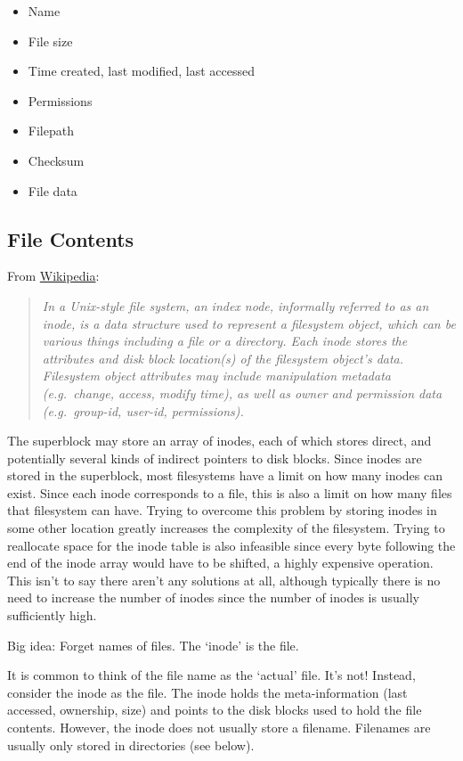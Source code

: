 \begin{itemize}
\tightlist
  \item Name
  \item File size
  \item Time created, last modified, last accessed
  \item Permissions
  \item Filepath
  \item Checksum
  \item File data
\end{itemize}

\subsection{File Contents}

From \href{http://en.wikipedia.org/wiki/Inode}{Wikipedia}:

\begin{quote}
  \emph{In a Unix-style file system, an index node, informally referred to as an inode, is a data structure used to represent a filesystem object, which can be various things including a file or a directory.
    Each inode stores the attributes and disk block location(s) of the filesystem object's data.
    Filesystem object attributes may include manipulation metadata (e.g.~change, access, modify time), as well as owner and permission data (e.g.~group-id, user-id, permissions).}
\end{quote}

The superblock may store an array of inodes, each of which stores direct, and potentially several kinds of indirect pointers to disk blocks.
Since inodes are stored in the superblock, most filesystems have a limit on how many inodes can exist.
Since each inode corresponds to a file, this is also a limit on how many files that filesystem can have.
Trying to overcome this problem by storing inodes in some other location greatly increases the complexity of the filesystem.
Trying to reallocate space for the inode table is also infeasible since every byte following the end of the inode array would have to be shifted, a highly expensive operation.
This isn't to say there aren't any solutions at all, although typically there is no need to increase the number of inodes since the number of inodes is usually sufficiently high.

Big idea: Forget names of files.
The `inode' is the file.

It is common to think of the file name as the `actual' file.
It's not!
Instead, consider the inode as the file.
The inode holds the meta-information (last accessed, ownership, size) and points to the disk blocks used to hold the file contents.
However, the inode does not usually store a filename.
Filenames are usually only stored in directories (see below).

